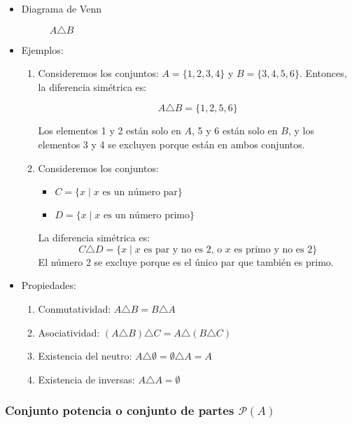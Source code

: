 \begin{itemize}
	\item Diagrama de Venn
		\begin{figure}[H]
			\centering
			\begin{venndiagram2sets}
				\fillOnlyA \fillOnlyB
			\end{venndiagram2sets}
			\caption*{$A \triangle B$}
		\end{figure}
	
	\item Ejemplos:
	\begin{enumerate}
		\item Consideremos los conjuntos: \(A = \{1, 2, 3, 4\}\) y \(B = \{3, 4, 5, 6\}\). Entonces, la diferencia simétrica es:
		
		$$A \triangle B = \{1, 2, 5, 6\}$$
		
		Los elementos 1 y 2 están solo en \(A\), 5 y 6 están solo en \(B\), y los elementos 3 y 4 se excluyen porque están en ambos conjuntos.
		
		\item Consideremos los conjuntos:
		\begin{itemize}
			\item \(C = \{x \mid x \mbox{ es un número par}\}\)
			\item \(D = \{x \mid x \mbox{ es un número primo}\}\)
		\end{itemize}
		
		La diferencia simétrica es:
		$$C \triangle D = \{x \mid x \text{ es par y no es 2, o } x \text{ es primo y no es 2}\}$$
		El número 2 se excluye porque es el único par que también es primo.
	\end{enumerate}
	
	\item Propiedades:
	\begin{enumerate}[label=\roman*)]
		\item Conmutatividad: \(A \triangle B = B \triangle A\)
		\item Asociatividad: \((A \triangle B) \triangle C = A \triangle (B \triangle C)\)
		\item Existencia del neutro: \( A \triangle \emptyset = \emptyset \triangle A = A \)
		\item Existencia de inversas: \( A \triangle A = \emptyset \)
	\end{enumerate}
\end{itemize}


\subsubsection{Conjunto potencia o conjunto de partes $\mathcal{P}(A)$}
\vspace{1em}

